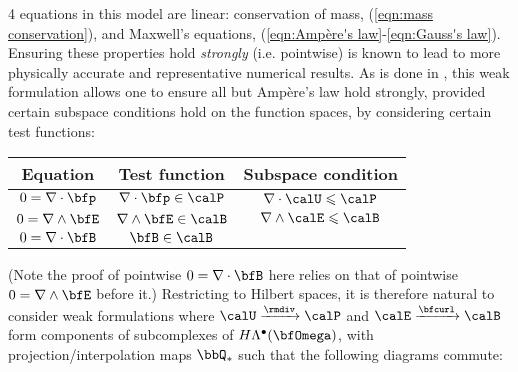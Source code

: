      4 equations in this model are linear: conservation of mass, (\ref{eqn:mass conservation}), and Maxwell's equations, (\ref{eqn:Ampère's law}-\ref{eqn:Gauss's law}). Ensuring these properties hold \emph{strongly} (i.e. pointwise) is known to lead to more physically accurate and representative numerical results. \BA{[Ref, ...]}  As is done in \cite{Laakmann_Farrell_Mitchell_22}, this weak formulation allows one to ensure all but Ampère's law hold strongly, provided certain subspace conditions hold on the function spaces, by considering certain test functions: 
    \begin{center}\begin{tabular}{ c | c | c }
        Equation  &  Test function  &  Subspace condition  \\
        \hline\hline
        $0  =  \nabla\cdot\bfp$  &  $\nabla\cdot\bfp  \in  \calP$  &  $\nabla\cdot\calU  \leqslant  \calP$  \\
        $0  =  \nabla\wedge\bfE$  &  $\nabla\wedge\bfE  \in  \calB$  &  $\nabla\wedge\calE  \leqslant  \calB$  \\
        $0  =  \nabla\cdot\bfB$  &  $\bfB  \in  \calB$  &
    \end{tabular}\end{center}
    (Note the proof of pointwise $0  =  \nabla\cdot\bfB$ here relies on that of pointwise $0  =  \nabla\wedge\bfE$ before it.) Restricting to Hilbert spaces, it is therefore natural to consider weak formulations where $\calU \xrightarrow{\rmdiv} \calP$ and $\calE \xrightarrow{\bfcurl} \calB$ form components of subcomplexes of $H\Lambda^{\bullet}(\bfOmega)$, with projection/interpolation maps $\bbQ_{*}$ such that the following diagrams commute:
